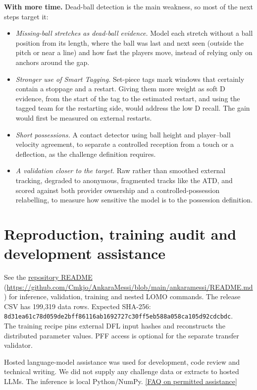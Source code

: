 \documentclass[10pt,a4paper]{article}
\begin{document}
\textbf{With more time.} Dead-ball detection is the main weakness, so most of the next steps target it:
\begin{itemize}[leftmargin=1.2em,itemsep=0.15em,topsep=0.2em]
  \item \emph{Missing-ball stretches as dead-ball evidence.} Model each stretch without a ball position
  from its length, where the ball was last and next seen (outside the pitch or near a line) and how fast
  the players move, instead of relying only on anchors around the gap.
  \item \emph{Stronger use of Smart Tagging.} Set-piece tags mark windows that certainly contain a stoppage
  and a restart. Giving them more weight as soft D evidence, from the start of the tag to the estimated
  restart, and using the tagged team for the restarting side, would address the low D recall. The gain
  would first be measured on external restarts.
  \item \emph{Short possessions.} A contact detector using ball height and player--ball velocity agreement,
  to separate a controlled reception from a touch or a deflection, as the challenge definition requires.
  \item \emph{A validation closer to the target.} Raw rather than smoothed external tracking, degraded to
  anonymous, fragmented tracks like the ATD, and scored against both provider ownership and a
  controlled-possession relabelling, to measure how sensitive the model is to the possession definition.
\end{itemize}

\section{Reproduction, training audit and development assistance}

See the \href{https://github.com/Cmkjo/AnkaraMessi/blob/main/ankaramessi/README.md}{repository README}
(\url{https://github.com/Cmkjo/AnkaraMessi/blob/main/ankaramessi/README.md}) for inference, validation,
training and nested LOMO commands. The
release CSV has 199,319 data rows. Expected SHA-256:\\
\texttt{\small 8d31ea61c78d059de2bff86116ab1692727c30ff5eb588a058ca105d92cdcbdc}.\\
The training recipe pins external DFL input hashes and reconstructs the distributed parameter values. PFF
access is optional for the separate transfer validator.

Hosted language-model assistance was used for development, code review and technical writing. We did not
supply any challenge data or extracts to hosted LLMs. The inference is local Python/NumPy.
\href{https://github.com/metrica-sports/more-than-a-hack-2027/blob/main/FAQ.md}{[FAQ on permitted assistance]}
\end{document}
